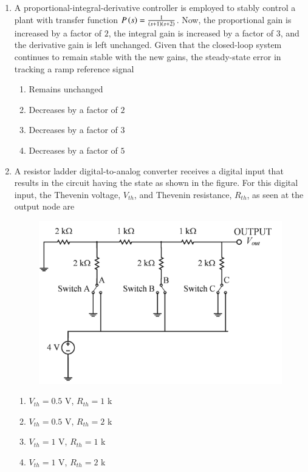 \documentclass[journal,12pt,onecolumn]{IEEEtran}
\theoremstyle{remark}
\begin{document}
\begin{enumerate}
\item A proportional-integral-derivative  controller is employed to stably control a plant with transfer function $P\left(s\right) = \frac{1}{\left(s+1\right)\left(s+2\right)}$. Now, the proportional gain is increased by a factor of $2$, the integral gain is increased by a factor of $3$, and the derivative gain is left unchanged. Given that the closed-loop system continues to remain stable with the new gains, the steady-state error in tracking a ramp reference signal \underline{\hspace{2cm}}

\hfill{}
\begin{enumerate}
\item Remains unchanged
\item Decreases by a factor of $2$
\item Decreases by a factor of $3$
\item Decreases by a factor of $5$
\end{enumerate}

\newpage

\item A resistor ladder digital-to-analog converter  receives a digital input that results in the circuit having the state as shown in the figure. For this digital input, the Thevenin voltage, $V_{th}$, and Thevenin resistance, $R_{th}$, as seen at the output node are \underline{\hspace{2cm}}

\hfill{}
\begin{figure}[H]
\includegraphics[width = 0.5\columnwidth]{q42}
\caption*{}
\label{q42}
\end{figure}
\begin{enumerate}
\item $V_{th} = 0.5$ V, $R_{th}= 1$ k\ohm
\item $V_{th}= 0.5$ V, $R_{th}= 2$ k\ohm
\item $V_{th}= 1$ V, $R_{th}= 1$ k\ohm
\item $V_{th}= 1$ V, $R_{th}= 2$ k\ohm
\end{enumerate}


\end{enumerate}
\end{document}
